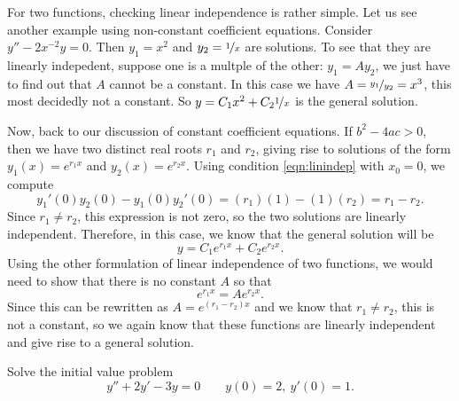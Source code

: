 For two functions, checking linear independence is rather simple.  Let us
see another example using non-constant coefficient equations.  Consider $y''-2x^{-2}y = 0$.  Then $y_1 = x^2$ and $y_2 =
\nicefrac{1}{x}$ are solutions.  To see that they are linearly indepedent,
suppose one is a multple of the other: $y_1 = A y_2$, we just have to find
out that $A$ cannot be a constant.  In this case we have $A =
\nicefrac{y_1}{y_2} = x^3$, this most decidedly not a constant.
So $y = C_1 x^2 + C_2 \nicefrac{1}{x}$ is the general solution.

\medskip

Now, back to our discussion of constant coefficient equations. If $b^2 - 4ac > 0$, then we have two distinct real roots $r_1$ and $r_2$, giving rise to solutions of the form $y_1(x) = e^{r_1x}$ and $y_2(x) = e^{r_2x}$. Using condition \ref{eqn:linindep} with $x_0 = 0$, we compute
\begin{equation*}
y_1'(0)y_2(0) - y_1(0)y_2'(0) = (r_1)(1) - (1)(r_2) = r_1 - r_2.
\end{equation*}
Since $r_1 \neq r_2$, this expression is not zero, so the two solutions are linearly independent. Therefore, in this case, we know that the general solution will be
\begin{equation*}
y = C_1e^{r_1x} + C_2e^{r_2x}.
\end{equation*}
Using the other formulation of linear independence of two functions, we would need to show that there is no constant $A$ so that 
\[ e^{r_1x} = A e^{r_2x}. \] Since this can be rewritten as $A = e^{(r_1-r_2)x}$ and we know that $r_1 \neq r_2$, this is not a constant, so we again know that these functions are linearly independent and give rise to a general solution.

\begin{example}
Solve the initial value problem
\begin{equation*}
y'' + 2y' - 3y = 0 \qquad y(0) = 2,\ y'(0) = 1. 
\end{equation*}
\end{example}

